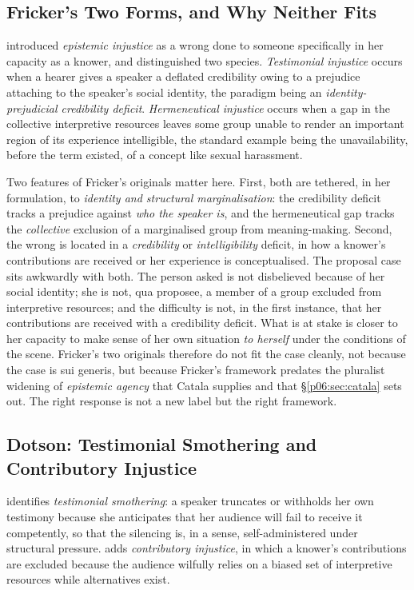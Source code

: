 \subsection{Fricker's Two Forms, and Why Neither Fits}

\textcite{fricker2007epistemic} introduced \emph{epistemic injustice} as a wrong done to someone specifically in her capacity as a knower, and distinguished two species. \emph{Testimonial injustice} occurs when a hearer gives a speaker a deflated credibility owing to a prejudice attaching to the speaker's social identity, the paradigm being an \emph{identity-prejudicial credibility deficit}. \emph{Hermeneutical injustice} occurs when a gap in the collective interpretive resources leaves some group unable to render an important region of its experience intelligible, the standard example being the unavailability, before the term existed, of a concept like sexual harassment.

Two features of Fricker's originals matter here. First, both are tethered, in her formulation, to \emph{identity and structural marginalisation}: the credibility deficit tracks a prejudice against \emph{who the speaker is}, and the hermeneutical gap tracks the \emph{collective} exclusion of a marginalised group from meaning-making. Second, the wrong is located in a \emph{credibility} or \emph{intelligibility} deficit, in how a knower's contributions are received or her experience is conceptualised. The proposal case sits awkwardly with both. The person asked is not disbelieved because of her social identity; she is not, qua proposee, a member of a group excluded from interpretive resources; and the difficulty is not, in the first instance, that her contributions are received with a credibility deficit. What is at stake is closer to her capacity to make sense of her own situation \emph{to herself} under the conditions of the scene. Fricker's two originals therefore do not fit the case cleanly, not because the case is sui generis, but because Fricker's framework predates the pluralist widening of \emph{epistemic agency} that Catala supplies and that §\ref{p06:sec:catala} sets out. The right response is not a new label but the right framework.

\subsection{Dotson: Testimonial Smothering and Contributory Injustice}

\textcite{dotson2011tracking} identifies \emph{testimonial smothering}: a speaker truncates or withholds her own testimony because she anticipates that her audience will fail to receive it competently, so that the silencing is, in a sense, self-administered under structural pressure. \textcite{dotson2012cautionary} adds \emph{contributory injustice}, in which a knower's contributions are excluded because the audience wilfully relies on a biased set of interpretive resources while alternatives exist.

